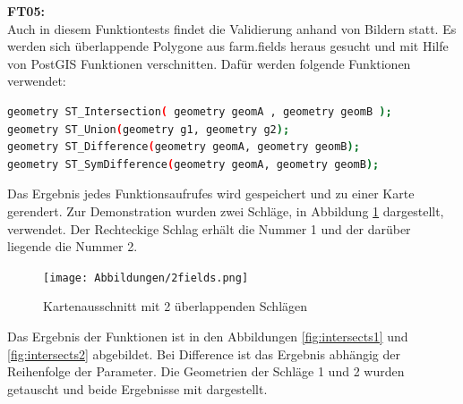 \textbf{FT05:}\\
Auch in diesem Funktiontests findet die Validierung anhand von Bildern statt.
Es werden sich überlappende Polygone aus farm.fields heraus gesucht und mit Hilfe von PostGIS Funktionen verschnitten.
Dafür werden folgende Funktionen verwendet:
\begin{lstlisting}[language=bash,caption={PostGIS Funktionen der Verschneidung},label=lst:fctsinsection]
geometry ST_Intersection( geometry geomA , geometry geomB );
geometry ST_Union(geometry g1, geometry g2);
geometry ST_Difference(geometry geomA, geometry geomB);
geometry ST_SymDifference(geometry geomA, geometry geomB);
\end{lstlisting}
Das Ergebnis jedes Funktionsaufrufes wird gespeichert und zu einer Karte gerendert.
Zur Demonstration wurden zwei Schläge, in Abbildung \ref{fig:2fields} dargestellt, verwendet.
Der Rechteckige Schlag erhält die Nummer 1 und der darüber liegende die Nummer 2.
\begin{figure}[h!]
\centering
\texttt{[image: Abbildungen/2fields.png]}
\caption[Kartenausschnitt mit 2 überlappenden Schlägen]{Kartenausschnitt mit 2 überlappenden Schlägen}
\label{fig:2fields}
\end{figure}
Das Ergebnis der Funktionen ist in den Abbildungen \ref{fig:intersects1} und \ref{fig:intersects2} abgebildet.
Bei Difference ist das Ergebnis abhängig der Reihenfolge der Parameter.
Die Geometrien der Schläge 1 und 2 wurden getauscht und beide Ergebnisse mit dargestellt.
